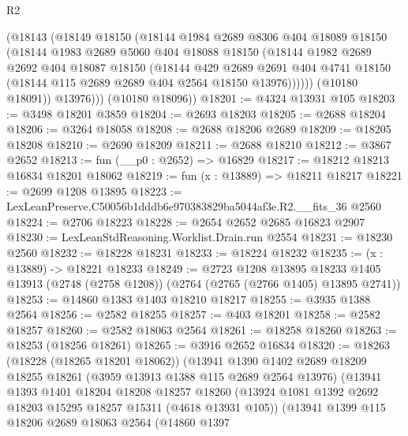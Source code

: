 \begin{lexlean}{R2}
\begin{coremodule}
            (@18143
              (@18149
                @18150
                (@18144
                  @1984
                  @2689
                  @8306
                  @404
                  @18089
                  @18150
                  (@18144
                    @1983
                    @2689
                    @5060
                    @404
                    @18088
                    @18150
                    (@18144
                      @1982
                      @2689
                      @2692
                      @404
                      @18087
                      @18150
                      (@18144
                        @429
                        @2689
                        @2691
                        @404
                        @4741
                        @18150
                        (@18144 @115 @2689 @2689 @404 @2564 @18150 @13976))))))
              (@10180 @18091))
            @13976)))
      (@10180 @18096))
@18201 := @4324 @13931 @105
@18203 := @3498 @18201 @3859
@18204 := @2693 @18203
@18205 := @2688 @18204
@18206 := @3264 @18058
@18208 := @2688 @18206 @2689
@18209 := @18205 @18208
@18210 := @2690 @18209
@18211 := @2688 @18210
@18212 := @3867 @2652
@18213 := fun (__p0 : @2652) => @16829
@18217 := @18212 @18213 @16834 @18201 @18062
@18219 := fun (x : @13889) => @18211 @18217
@18221 := @2699 @1208 @13895
@18223 := LexLeanPreserve.C50056b1dddb6e970383829ba5044af3e.R2.__fits_36 @2560
@18224 := @2706 @18223
@18228 := @2654 @2652 @2685 @16823 @2907
@18230 := LexLeanStdReasoning.Worklist.Drain.run @2554
@18231 := @18230 @2560
@18232 := @18228 @18231
@18233 := @18224 @18232
@18235 := (x : @13889) -> @18221 @18233
@18249 := @2723
    @1208
    @13895
    @18233
    @1405
    @13913
    (@2748 (@2758 @1208))
    (@2764 (@2765 (@2766 @1405) @13895 @2741))
@18253 := @14860 @1383 @1403 @18210 @18217
@18255 := @3935 @1388 @2564
@18256 := @2582 @18255
@18257 := @403 @18201
@18258 := @2582 @18257
@18260 := @2582 @18063 @2564
@18261 := @18258 @18260
@18263 := @18253 (@18256 @18261)
@18265 := @3916 @2652 @16834
@18320 := @18263
    (@18228 (@18265 @18201 @18062))
    (@13941
      @1390
      @1402
      @2689
      @18209
      @18255
      @18261
      (@3959 @13913 @1388 @115 @2689 @2564 @13976)
      (@13941
        @1393
        @1401
        @18204
        @18208
        @18257
        @18260
        (@13924 @1081 @1392 @2692 @18203 @15295 @18257 @15311 (@4618 @13931 @105))
        (@13941
          @1399
          @115
          @18206
          @2689
          @18063
          @2564
          (@14860
            @1397

\end{coremodule}
\end{lexlean}
